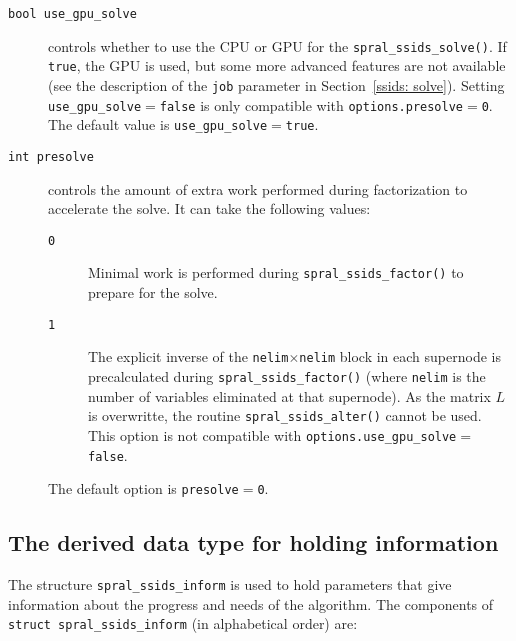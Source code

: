 
\begin{description}
\item[\texttt{bool use\_gpu\_solve}] controls
   whether to use the CPU or GPU for the \texttt{spral\_ssids\_solve()}. If
   \texttt{true}, the GPU is used, but some more advanced features are not
   available (see the description of the \texttt{job} parameter in
   Section~\ref{ssids: solve}).
   Setting \texttt{use\_gpu\_solve}$=${\tt false} is only compatible with
   \texttt{options.presolve}$=${\tt 0}.
   The default value is \texttt{use\_gpu\_solve}$=$\texttt{true}.
\item[\texttt{int presolve}] controls the
   amount of extra work performed during factorization to accelerate the solve.
   It can take the following values:
   \begin{description}
      \item[\texttt{0}] Minimal work is performed during {\tt spral\_ssids\_factor()}
         to prepare for the solve.
      \item[\texttt{1}] The explicit inverse of the
         \texttt{nelim}$\times$\texttt{nelim} block in each supernode is
         precalculated during {\tt spral\_ssids\_factor()} (where \texttt{nelim} is
         the number of variables eliminated at that supernode). As the matrix
         $L$ is overwritte, the routine {\tt spral\_ssids\_alter()} cannot be
         used.
         This option is not compatible with {\tt options.use\_gpu\_solve}$=$\texttt{false}.
   \end{description}
   The default option is \texttt{presolve}$=$\texttt{0}.
\end{description}


\subsection{The derived data type for holding information}
\label{ssids: typeinform}
The structure {\tt spral\_ssids\_inform}
is used to hold parameters that give information about the progress and needs
of the algorithm. The components of {\tt struct spral\_ssids\_inform}
(in alphabetical order) are:

